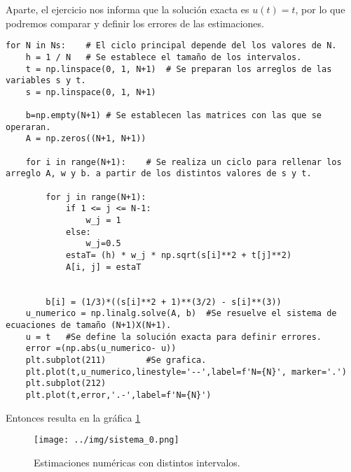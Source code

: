 \documentclass[../portafolio.tex]{subfiles}
\begin{document}
Aparte, el ejercicio nos informa que la solución exacta es $u(t)=t$, por lo que podremos comparar y definir los errores de las estimaciones.

\begin{verbatim}
for N in Ns: 	# El ciclo principal depende del los valores de N.
    h = 1 / N	# Se establece el tamaño de los intervalos.
    t = np.linspace(0, 1, N+1) 	# Se preparan los arreglos de las variables s y t.
    s = np.linspace(0, 1, N+1) 
    
    b=np.empty(N+1)	# Se establecen las matrices con las que se operaran.
    A = np.zeros((N+1, N+1))
    
    for i in range(N+1):	# Se realiza un ciclo para rellenar los arreglo A, w y b. a partir de los distintos valores de s y t.
        
        for j in range(N+1):
            if 1 <= j <= N-1:
                w_j = 1
            else:
                w_j=0.5 
            estaT= (h) * w_j * np.sqrt(s[i]**2 + t[j]**2)
            A[i, j] = estaT

        
        b[i] = (1/3)*((s[i]**2 + 1)**(3/2) - s[i]**(3))
    u_numerico = np.linalg.solve(A, b)	#Se resuelve el sistema de ecuaciones de tamaño (N+1)X(N+1).
    u = t 	#Se define la solución exacta para definir errores.
    error =(np.abs(u_numerico- u))
    plt.subplot(211)		#Se grafica.
    plt.plot(t,u_numerico,linestyle='--',label=f'N={N}', marker='.')
    plt.subplot(212)
    plt.plot(t,error,'.-',label=f'N={N}')
\end{verbatim}

Entonces resulta en la gráfica \ref{g3_ej12:graf}

\begin{figure}
\centering
\texttt{[image: ../img/sistema\_0.png]}
\caption{Estimaciones numéricas con distintos intervalos.}\label{g3_ej12:graf}
\end{figure}
\end{document}
